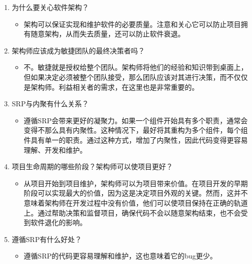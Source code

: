 

\begin{enumerate}
\item 
为什么要关心软件架构？

\begin{itemize}
\item 
架构可以保证实现和维护软件的必要质量。注意和关心它可以防止项目拥有随意架构，从而失去质量，还可以防止软件衰退。
\end{itemize}

\item 
架构师应该成为敏捷团队的最终决策者吗？
\begin{itemize}
\item 
不。敏捷就是授权给整个团队。架构师将他们的经验和知识带到桌面上，但如果决定必须被整个团队接受，那么团队应该对其进行决策，而不仅仅是架构师。利益相关者的需求，在这里也是非常重要的。
\end{itemize}

\item 
SRP与内聚有什么关系？

\begin{itemize}
\item 
遵循SRP会带来更好的凝聚力。如果一个组件开始具有多个职责，通常会变得不那么具有内聚性。这种情况下，最好将其重构为多个组件，每个组件具有单一的职责。通过这种方式，增加了内聚性，因此代码变得更容易理解、开发和维护。
\end{itemize}

\item
项目生命周期的哪些阶段？架构师可以使项目更好？

\begin{itemize}
\item 
从项目开始到项目维护，架构师可以为项目带来价值。在项目开发的早期阶段可以实现最大的价值，因为这是决定项目外观的关键。然而，这并不意味着架构师在开发过程中没有价值，他们可以使项目保持在正确的轨道上。通过帮助决策和监督项目，确保代码不会以随意架构结束，也不会受到软件退化的影响。
\end{itemize}

\item
遵循SRP有什么好处？

\begin{itemize}
\item 
遵循SRP的代码更容易理解和维护，这也意味着它的bug更少。
\end{itemize}

\end{enumerate}